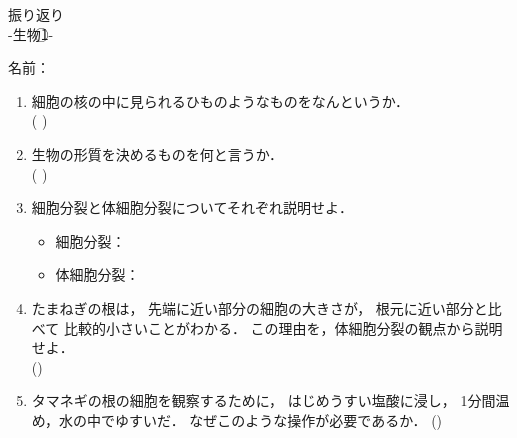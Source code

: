 \documentclass[fontsize=15pt]{jlreq}
\begin{document}
\begin{center}
{\LARGE {振り返り}} \\
-生物\textcircled{\scriptsize 1}- %
\end{center}
\vspace{1em}
\begin{flushright}
名前：\underline{\hspace{5cm}}
\end{flushright}

\begin{enumerate}
    \item 細胞の核の中に見られるひものようなものをなんというか．\\
    ( \hspace{2cm} )
    \vspace{2em} 

    \item 生物の形質を決めるものを何と言うか．\\
    ( \hspace{2cm} )
    \vspace{2em} 

    \item 細胞分裂と体細胞分裂についてそれぞれ説明せよ．
    \begin{itemize}
      \item 細胞分裂：
      \vspace{2em}
      \item 体細胞分裂：
    \end{itemize}
    \vspace{2em} 

    \item たまねぎの根は，
     先端に近い部分の細胞の大きさが，
    根元に近い部分と比べて
    比較的小さいことがわかる．
    この理由を，体細胞分裂の観点から説明せよ． \\
    (\hspace{15cm})
    \vspace{2em} 

    \item タマネギの根の細胞を観察するために，
    はじめうすい塩酸に浸し，
    1分間温め，水の中でゆすいだ．
    なぜこのような操作が必要であるか．
    (\hspace{15cm})
    \vspace{2em} 

\end{enumerate}
\end{document}

